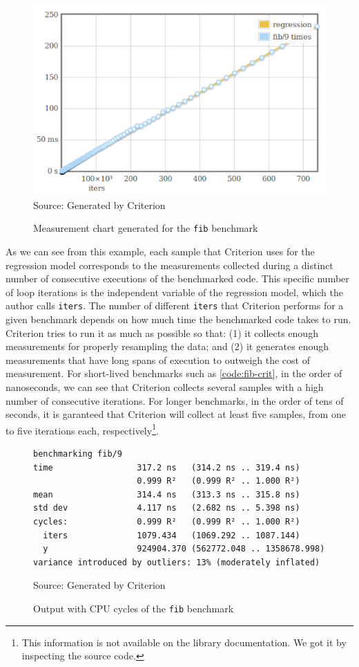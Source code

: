 \begin{figure}[htp]
  \centering
  \caption{Measurement chart generated for the \texttt{fib} benchmark}
  \includegraphics[width=.6\columnwidth]{images/criterion-chart} \\
  \footnotesize{Source: Generated by Criterion}
  \label{fig:crit-chart}
\end{figure}

As we can see from this example, each sample that Criterion uses for the regression model corresponds to the measurements collected during a distinct number of consecutive executions of the benchmarked code. This specific number of loop iterations is the independent variable of the regression model, which the author calls \texttt{iters}. The number of different \texttt{iters} that Criterion performs for a given benchmark depends on how much time the benchmarked code takes to run. Criterion tries to run it as much as possible so that: (1) it collects enough measurements for properly resampling the data; and (2) it generates enough measurements that have long spans of execution to outweigh the cost of measurement. For short-lived benchmarks such as \autoref{code:fib-crit}, in the order of nanoseconds, we can see that Criterion collects several samples with a high number of consecutive iterations. For longer benchmarks, in the order of tens of seconds, it is garanteed that Criterion will collect at least five samples, from one to five iterations each, respectively\footnote{This information is not available on the library documentation. We got it by inspecting the source code.}.

\begin{figure}[htp]
  \centering
  \caption{Output with CPU cycles of the \texttt{fib} benchmark}
  \begin{verbatim}
benchmarking fib/9
time                 317.2 ns   (314.2 ns .. 319.4 ns)
                     0.999 R²   (0.999 R² .. 1.000 R²)
mean                 314.4 ns   (313.3 ns .. 315.8 ns)
std dev              4.117 ns   (2.682 ns .. 5.398 ns)
cycles:              0.999 R²   (0.999 R² .. 1.000 R²)
  iters              1079.434   (1069.292 .. 1087.144)
  y                  924904.370 (562772.048 .. 1358678.998)
variance introduced by outliers: 13% (moderately inflated)
  \end{verbatim}
  \footnotesize{Source: Generated by Criterion}
  \label{fig:fib-cycle-output}
\end{figure}

